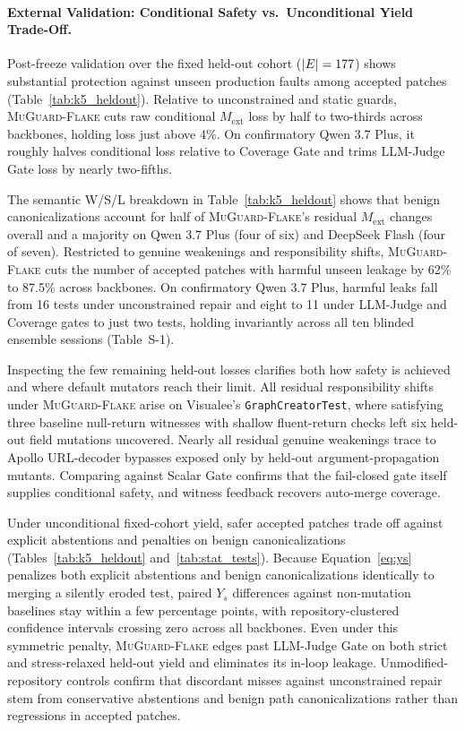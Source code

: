 

\paragraph{External Validation: Conditional Safety vs.\ Unconditional Yield Trade-Off.}
Post-freeze validation over the fixed held-out cohort ($|E| = 177$) shows substantial protection against unseen production faults among accepted patches (Table~\ref{tab:k5_heldout}). Relative to unconstrained and static guards, \textsc{MuGuard-Flake} cuts raw conditional $M_{\text{ext}}$ loss by half to two-thirds across backbones, holding loss just above 4\%. On confirmatory Qwen 3.7 Plus, it roughly halves conditional loss relative to Coverage Gate and trims LLM-Judge Gate loss by nearly two-fifths.

The semantic W/S/L breakdown in Table~\ref{tab:k5_heldout} shows that benign canonicalizations account for half of \textsc{MuGuard-Flake}'s residual $M_{\text{ext}}$ changes overall and a majority on Qwen 3.7 Plus (four of six) and DeepSeek Flash (four of seven). Restricted to genuine weakenings and responsibility shifts, \textsc{MuGuard-Flake} cuts the number of accepted patches with harmful unseen leakage by 62\% to 87.5\% across backbones. On confirmatory Qwen 3.7 Plus, harmful leaks fall from 16 tests under unconstrained repair and eight to 11 under LLM-Judge and Coverage gates to just two tests, holding invariantly across all ten blinded ensemble sessions (Table~S-1).

Inspecting the few remaining held-out losses clarifies both how safety is achieved and where default mutators reach their limit. All residual responsibility shifts under \textsc{MuGuard-Flake} arise on Visualee's \texttt{GraphCreatorTest}, where satisfying three baseline null-return witnesses with shallow fluent-return checks left six held-out field mutations uncovered. Nearly all residual genuine weakenings trace to Apollo URL-decoder bypasses exposed only by held-out argument-propagation mutants. Comparing against Scalar Gate confirms that the fail-closed gate itself supplies conditional safety, and witness feedback recovers auto-merge coverage.



Under unconditional fixed-cohort yield, safer accepted patches trade off against explicit abstentions and penalties on benign canonicalizations (Tables~\ref{tab:k5_heldout} and~\ref{tab:stat_tests}). Because Equation~\ref{eq:ys} penalizes both explicit abstentions and benign canonicalizations identically to merging a silently eroded test, paired $Y_s$ differences against non-mutation baselines stay within a few percentage points, with repository-clustered confidence intervals crossing zero across all backbones. Even under this symmetric penalty, \textsc{MuGuard-Flake} edges past LLM-Judge Gate on both strict and stress-relaxed held-out yield and eliminates its in-loop leakage. Unmodified-repository controls confirm that discordant misses against unconstrained repair stem from conservative abstentions and benign path canonicalizations rather than regressions in accepted patches.

